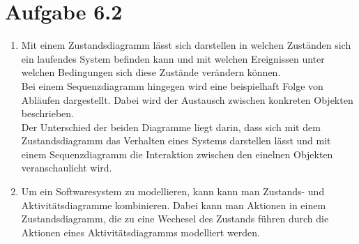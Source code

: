 \documentclass[a4paper,11pt]{scrartcl}
\renewcommand{\labelenumi}{(\roman{enumi})}
\begin{document}
\newpage

    \section*{Aufgabe 6.2}
    \renewcommand{\labelenumi}{\alph{enumi})}
    \begin{enumerate}
        \item Mit einem Zustandsdiagramm lässt sich darstellen in welchen Zuständen sich ein laufendes System befinden kann und mit
                welchen Ereignissen unter welchen Bedingungen sich diese Zustände verändern können.\\
                Bei einem Sequenzdiagramm hingegen wird eine beispielhaft Folge von Abläufen dargestellt. Dabei wird der Austausch
                zwischen konkreten Objekten beschrieben.\\
                Der Unterschied der beiden Diagramme liegt darin, dass sich mit dem Zustandsdiagramm das Verhalten eines Systems
                darstellen lässt und mit einem Sequenzdiagramm die Interaktion zwischen den einelnen Objekten veranschaulicht wird.
        \item Um ein Softwaresystem zu modellieren, kann kann man Zustands- und Aktivitätsdiagramme kombinieren. Dabei kann man
                Aktionen in einem Zustandsdiagramm, die zu eine Wechesel des Zustands führen durch die Aktionen eines Aktivitätsdiagramms
                modelliert werden.
    \end{enumerate}
\end{document}
